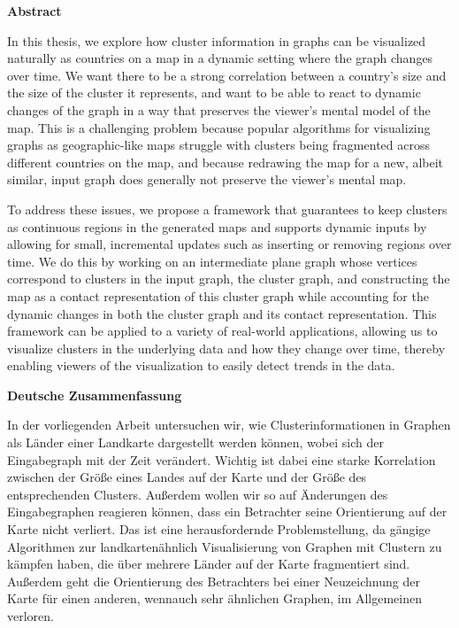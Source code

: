 \begin{addmargin}{0.5cm}

\centerline{\textbf{Abstract}}

In this thesis, we explore how cluster information in graphs can be visualized naturally as countries on a map in a dynamic setting where the graph changes over time.
We want there to be a strong correlation between a country's size and the size of the cluster it represents, and want to be able to react to dynamic changes of the graph in a way that preserves the viewer's mental model of the map.
This is a challenging problem because popular algorithms for visualizing graphs as geographic-like maps struggle with clusters being fragmented across different countries on the map, and because redrawing the map for a new, albeit similar, input graph does generally not preserve the viewer's mental map.

To address these issues, we propose a framework that guarantees to keep clusters as continuous regions in the generated maps and supports dynamic inputs by allowing for small, incremental updates such as inserting or removing regions over time.
We do this by working on an intermediate plane graph whose vertices correspond to clusters in the input graph, the cluster graph, and constructing the map as a contact representation of this cluster graph while accounting for the dynamic changes in both the cluster graph and its contact representation.
This framework can be applied to a variety of real-world applications, allowing us to visualize clusters in the underlying data and how they change over time, thereby enabling viewers of the visualization to easily detect trends in the data.

\vskip 2cm

\centerline{\textbf{Deutsche Zusammenfassung}}

In der vorliegenden Arbeit untersuchen wir, wie Clusterinformationen in Graphen als Länder einer Landkarte dargestellt werden können, wobei sich der Eingabegraph mit der Zeit verändert.
Wichtig ist dabei eine starke Korrelation zwischen der Größe eines Landes auf der Karte und der Größe des entsprechenden Clusters.
Außerdem wollen wir so auf Änderungen des Eingabegraphen reagieren können, dass ein Betrachter seine Orientierung auf der Karte nicht verliert.
Das ist eine herausfordernde Problemstellung, da gängige Algorithmen zur landkartenähnlich Visualisierung von Graphen mit Clustern zu kämpfen haben, die über mehrere Länder auf der Karte fragmentiert sind.
Außerdem geht die Orientierung des Betrachters bei einer Neuzeichnung der Karte für einen anderen, wennauch sehr ähnlichen Graphen, im Allgemeinen verloren.


\end{addmargin}

